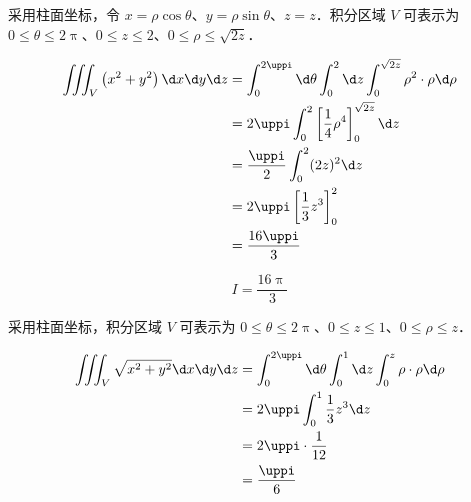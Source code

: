 \begin{solution}
    采用柱面坐标，令 $x=\rho \cos \theta$、$y=\rho \sin \theta$、$z=z$．积分区域 $V$ 可表示为 $0 \le \theta \le 2 \uppi$、$0 \le z \le 2$、$0 \le \rho \le \sqrt{2 z}$．

    \begin{equation}
        \begin{aligned}
            \iiint_{V}\left(x^{2}+y^{2}\right) \d x \d y \d z & = \int_{0}^{2 \uppi} \d \theta \int_{0}^{2} \d z \int_{0}^{\sqrt{2 z}} \rho^{2} \cdot \rho \d \rho \\
                                                              & = 2 \uppi \int_{0}^{2} \left[ \frac{1}{4} \rho^{4} \right]_{0}^{\sqrt{2 z}} \d z                   \\
                                                              & = \frac{\uppi}{2} \int_{0}^{2} (2 z)^{2} \d z                                                      \\
                                                              & = 2 \uppi \left[ \frac{1}{3} z^3 \right]_{0}^{2}                                                   \\
                                                              & = \frac{16 \uppi}{3} \label{eq:I1}
        \end{aligned}
    \end{equation}

    \begin{equation}
        I = \boxed{\frac{16 \uppi}{3}}
    \end{equation}

    采用柱面坐标，积分区域 $V$ 可表示为 $0 \le \theta \le 2 \uppi$、$0 \le z \le 1$、$0 \le \rho \le z$．

    \begin{equation}
        \begin{aligned}
            \iiint_{V} \sqrt{x^{2}+y^{2}} \d x \d y \d z & = \int_{0}^{2 \uppi} \d \theta \int_{0}^{1} \d z \int_{0}^{z} \rho \cdot \rho \d \rho \\
                                                         & = 2 \uppi \int_{0}^{1} \frac{1}{3} z^{3} \d z                                         \\
                                                         & = 2 \uppi \cdot \frac{1}{12}                                                          \\
                                                         & = \frac{\uppi}{6} \label{eq:I2}
        \end{aligned}
    \end{equation}


\end{solution}
